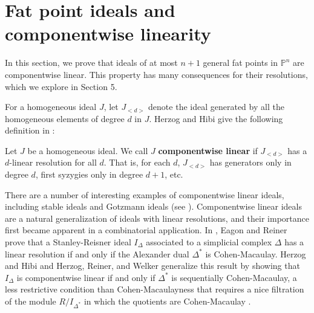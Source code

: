 \documentclass{article}
\begin{document}

\section[4]{Fat point ideals and componentwise linearity}\label{s:cwl}

In this section, we prove that ideals of at most $n+1$ general fat points in $\mathbb P^n$ are componentwise linear. This property has many consequences for their resolutions, which we explore in Section 5.

For a homogeneous ideal $J$, let $J_{<d>}$ denote the ideal generated by all the homogeneous elements of degree $d$ in $J$. Herzog and Hibi give the following definition in \cite{HerzogHibi}:

\begin{definition}
\label{cwdef}
Let $J$ be a homogeneous ideal. We call $J$ \textbf{componentwise linear} if $J_{<d>}$ has a $d$-linear resolution for all $d$. That is, for each $d$, $J_{<d>}$ has generators only in degree $d$, first syzygies only in degree $d+1$, etc.
\end{definition}

There are a number of interesting examples of componentwise linear ideals, including stable ideals and Gotzmann ideals (see \cite{HerzogHibi}). Componentwise linear ideals are a natural generalization of ideals with linear resolutions, and their importance first became apparent in a combinatorial application. In \cite{EagonReiner}, Eagon and Reiner prove that a Stanley-Reisner ideal $I_{\Delta}$ associated to a simplicial complex $\Delta$ has a linear resolution if and only if the Alexander dual $\Delta^*$ is Cohen-Macaulay. Herzog and Hibi and Herzog, Reiner, and Welker generalize this result by showing that $I_{\Delta}$ is componentwise linear if and only if $\Delta^*$ is sequentially Cohen-Macaulay, a less restrictive condition than Cohen-Macaulayness that requires a nice filtration of the module $R/I_{\Delta^*}$ in which the quotients are Cohen-Macaulay \cite{HerzogHibi, HRW}.
\end{document}
